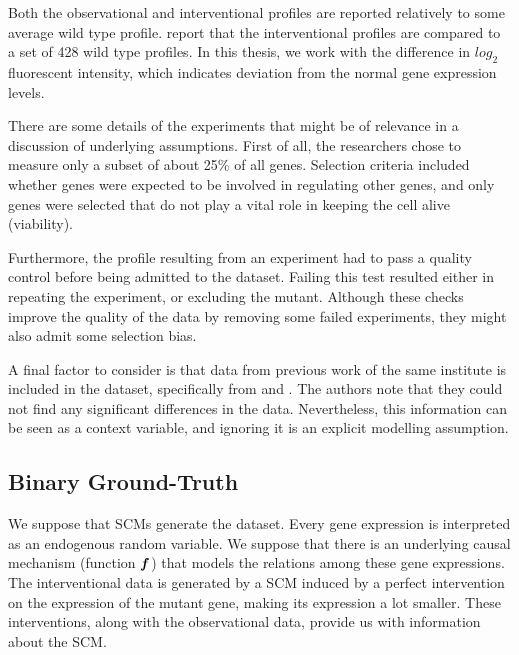 Both the observational and interventional profiles are reported relatively to some average wild type profile. \citet{kemmeren2014large} report that the interventional profiles are compared to a set of 428 wild type profiles. In this thesis, we work with the difference in $log_2$ fluorescent intensity, which indicates deviation from the normal gene expression levels.


There are some details of the experiments that might be of relevance in a discussion of underlying assumptions. First of all, the researchers chose to measure only a subset of about 25\% of all genes. Selection criteria included whether genes were expected to be involved in regulating other genes, and only genes were selected that do not play a vital role in keeping the cell alive (viability). 

Furthermore, the profile resulting from an experiment had to pass a quality control before being admitted to the dataset. Failing this test resulted either in repeating the experiment, or excluding the mutant. Although these checks improve the quality of the data by removing some failed experiments, they might also admit some selection bias. 

A final factor to consider is that  data from previous work of the same institute is included in the dataset, specifically from \citet{lenstra2011specificity} and \citet{van2010functional}. The authors note that they could not find any significant differences in the data. Nevertheless, this information can be seen as a context variable, and ignoring it is an explicit modelling assumption.

\subsection{Binary Ground-Truth}
We suppose that SCMs generate the dataset. Every gene expression is interpreted as an endogenous random variable. We suppose that there is an underlying causal mechanism (function $\bm{f}$) that models the relations among these gene expressions. The interventional data is generated by a SCM induced by a perfect intervention on the expression of the mutant gene, making its expression a lot smaller. These interventions, along with the observational data, provide us with information about the SCM. 

